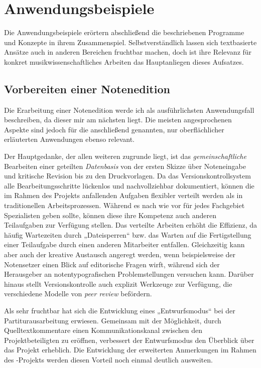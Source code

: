 \documentclass[DIV=12]{scrreprt}
\begin{document}
\chapter{Anwendungsbeispiele}
\label{chap:pt_applications}

Die Anwendungsbeispiele erörtern abschließend die beschriebenen Programme und Konzepte in ihrem Zusammenspiel.
Selbstverständlich lassen sich textbasierte Ansätze auch in anderen Bereichen fruchtbar machen, doch ist ihre Relevanz für konkret musikwissenschaftliches Arbeiten das Hauptanliegen dieses Aufsatzes.

\section{Vorbereiten einer Notenedition}
\label{sec:pt_preparing-edition}
Die Erarbeitung einer Notenedition werde ich als ausführlichsten Anwendungsfall beschreiben, da dieser mir am nächsten liegt.
Die meisten angesprochenen Aspekte sind jedoch für die anschließend genannten, nur oberflächlicher erläuterten Anwendungen ebenso relevant.

\medskip
 
Der Hauptgedanke, der allen weiteren zugrunde liegt, ist das \emph{gemeinschaftliche} Bearbeiten einer geteilten \emph{Datenbasis} von der ersten Skizze über Noteneingabe und kritische Revision bis zu den Druckvorlagen.
Da das Versionskontrollsystem alle Bearbeitungsschritte lückenlos und nachvollziehbar dokumentiert, können die im Rahmen des Projekts anfallenden Aufgaben flexibler verteilt werden als in traditionellen Arbeitsprozessen.
Während es nach wie vor für jedes Fachgebiet Spezialisten geben sollte, können diese ihre Kompetenz auch anderen Teilaufgaben zur Verfügung stellen.
Das verteilte Arbeiten erhöht die Effizienz, da häufig Wartezeiten durch „Dateisperren“ bzw. das Warten auf die Fertigstellung einer Teilaufgabe durch einen anderen Mitarbeiter entfallen.
Gleichzeitig kann aber auch der kreative Austausch angeregt werden, wenn beispielsweise der Notensetzer einen Blick auf editorische Fragen wirft, während sich der Herausgeber an notentypografischen Problemstellungen versuchen kann.
Darüber hinaus stellt Versionskontrolle auch explizit Werkzeuge zur Verfügung, die verschiedene Modelle von \emph{peer review} befördern.

Als sehr fruchtbar hat sich die Entwicklung eines „Entwurfsmodus“ bei der Partiturausarbeitung erwiesen.
Gemeinsam mit der Möglichkeit, durch Quelltextkommentare einen Kommunikationskanal zwischen den Projektbeteiligten zu eröffnen, verbessert der Entwurfsmodus den Überblick über das Projekt erheblich.
Die Entwicklung der erweiterten Anmerkungen im Rahmen des -Projekts werden diesen Vorteil noch einmal deutlich ausweiten.
\end{document}
